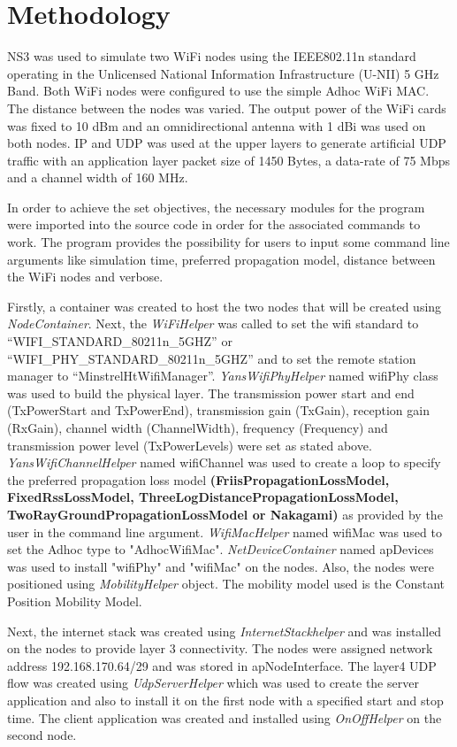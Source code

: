 \documentclass[a4paper, twocolumn, twoside, 12pt]{article}
\begin{document}
\section{Methodology \vspace{-0.2em}}
NS3 was used to simulate two WiFi nodes using the IEEE802.11n standard operating in the Unlicensed National Information Infrastructure (U-NII) 5 GHz Band. Both WiFi nodes were configured to use the simple Adhoc WiFi MAC. The distance between the nodes was varied.  The output power of the WiFi cards was fixed to 10 dBm and an omnidirectional antenna with 1 dBi was used on both nodes. IP and UDP was used at the upper layers to generate artificial UDP traffic with an application layer packet size of 1450 Bytes, a data-rate of 75 Mbps and a channel width of 160 MHz.

In order to achieve the set objectives, the necessary modules for the program were imported into the source code in order for the associated commands to work. The program provides the possibility for users to input some command line arguments like simulation time, preferred propagation model, distance between the WiFi nodes and verbose.

Firstly, a container was created to host the two nodes that will be created using \textit{NodeContainer}. Next, the \textit{WiFiHelper} was called to set the wifi standard to “WIFI\_STANDARD\_80211n\_5GHZ” or “WIFI\_PHY\_STANDARD\_80211n\_5GHZ” and to set the remote station manager to “MinstrelHtWifiManager”. \textit{YansWifiPhyHelper} named wifiPhy class was used to build the physical layer. The transmission power start and end (TxPowerStart and TxPowerEnd), transmission gain (TxGain), reception gain (RxGain), channel width (ChannelWidth), frequency (Frequency) and transmission power level (TxPowerLevels) were set as stated above. \textit{YansWifiChannelHelper} named wifiChannel was used to create a loop to specify the preferred propagation loss model \textbf{(FriisPropagationLossModel,  FixedRssLossModel, ThreeLogDistancePropagationLossModel, TwoRayGroundPropagationLossModel or Nakagami)} as provided by the user in the command line argument. \textit{WifiMacHelper} named wifiMac was used to set the Adhoc type to "AdhocWifiMac". \textit{NetDeviceContainer} named apDevices was used to install "wifiPhy" and "wifiMac" on the nodes. Also, the nodes were positioned using \textit{MobilityHelper} object. The mobility model used is the Constant Position Mobility Model.

Next, the internet stack was created using \textit{InternetStackhelper} and was installed on the nodes to provide layer 3 connectivity. The nodes were assigned network address 192.168.170.64/29 and was stored in apNodeInterface. The layer4 UDP flow was created using \textit{UdpServerHelper} which was used to create the server application and also to install it on the first node with a specified start and stop time.  The client application was created and installed using \textit{OnOffHelper} on the second node.
\end{document}
